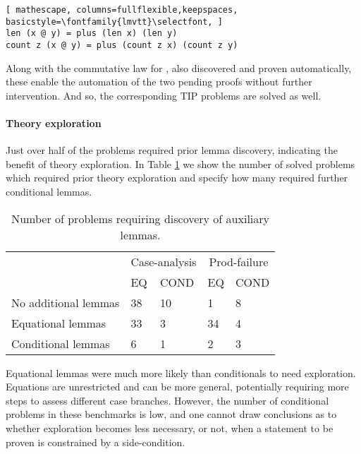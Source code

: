 \begin{lstlisting}[ mathescape, columns=fullflexible,keepspaces, basicstyle=\fontfamily{lmvtt}\selectfont, ]
len (x @ y) = plus (len x) (len y)
count z (x @ y) = plus (count z x) (count z y)
\end{lstlisting}

\noindent Along with the commutative law for , also discovered and proven automatically, these enable the automation of the two pending proofs without further intervention.
%
And so, the corresponding TIP problems are solved as well.



\paragraph{Theory exploration}

Just over half of the problems required prior lemma discovery, indicating the benefit of theory exploration. In Table \ref{tab:explore} we show the number of solved problems which required prior theory exploration and specify how many required further conditional lemmas.

\begin{table}
\begin{tabularx}{\textwidth}{l | X X | X X}
  & \multicolumn{2}{c|}{Case-analysis} & \multicolumn{2}{c}{Prod-failure} \\
  &  EQ & COND & EQ & COND \\
  \hline
  No additional lemmas & 38 & 10 & 1 & 8 \\
  Equational lemmas & 33 & 3 & 34 & 4 \\
  Conditional lemmas & 6 & 1 & 2 & 3 \\
\end{tabularx}
\caption{Number of problems requiring discovery of auxiliary lemmas.}
\label{tab:explore}
\end{table}

Equational lemmas were much more likely than conditionals to need exploration.
%
Equations are unrestricted and can be more general, potentially requiring more steps to assess different case branches.
%
However, the number of conditional problems in these benchmarks is low, and one cannot draw conclusions as to whether exploration becomes less necessary, or not, when a statement to be proven is constrained by a side-condition.%

